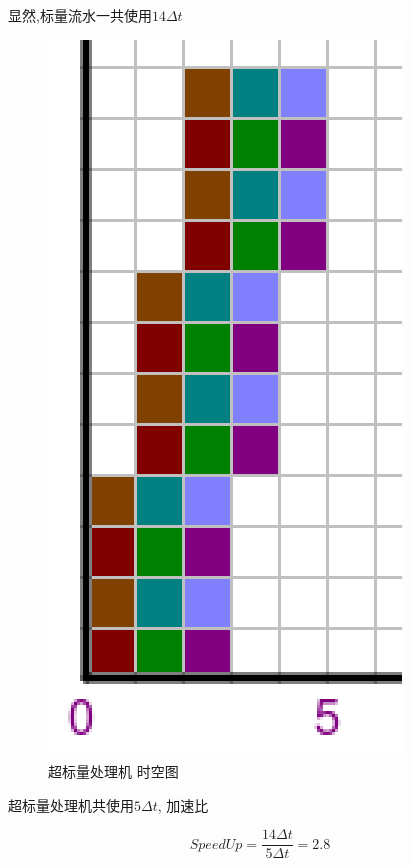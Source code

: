 \documentclass{article}
\begin{document}
\begin{CJK}{UTF8}{gbsn}
显然,标量流水一共使用$14\Delta t$

\begin{figure}[H]
\centering
\includegraphics[scale=0.3]{hw3-img2.png}
\caption{超标量处理机 时空图}
\end{figure}

超标量处理机共使用$5\Delta t$, 加速比

$$SpeedUp = \frac{14\Delta t}{5\Delta t} = 2.8$$


\end{CJK}
\end{document}
